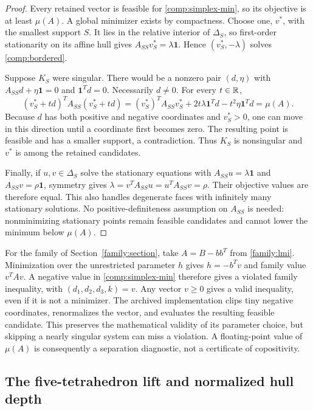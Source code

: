 \begin{proof}
Every retained vector is feasible for \eqref{comp:simplex-min}, so its
objective is at least $\mu(A)$. A global minimizer exists by compactness.
Choose one, $v^*$, with the smallest support $S$. It lies in the relative
interior of $\Delta_S$, so first-order stationarity on its affine hull gives
$A_{SS}v^*_S=\lambda\mathbf1$. Hence $(v^*_S,-\lambda)$ solves
\eqref{comp:bordered}.

Suppose $K_S$ were singular. There would be a nonzero pair $(d,\eta)$ with
$A_{SS}d+\eta\mathbf1=0$ and $\mathbf1^Td=0$. Necessarily $d\ne0$.
For every $t\in\mathbb R$,
\[
 (v^*_S+td)^TA_{SS}(v^*_S+td)
 = (v^*_S)^TA_{SS}v^*_S
   +2t\lambda\mathbf1^Td-t^2\eta\mathbf1^Td
 =\mu(A).
\]
Because $d$ has both positive and negative coordinates and $v^*_S>0$,
one can move in this direction until a coordinate first becomes zero.
The resulting point is feasible and has a smaller support, a contradiction.
Thus $K_S$ is nonsingular and $v^*$ is among the retained candidates.

Finally, if $u,v\in\Delta_S$ solve the stationary equations with
$A_{SS}u=\lambda\mathbf1$ and $A_{SS}v=\rho\mathbf1$, symmetry gives
$\lambda=v^TA_{SS}u=u^TA_{SS}v=\rho$. Their objective values are
therefore equal. This also handles degenerate faces with infinitely many
stationary solutions. No positive-definiteness assumption on $A_{SS}$
is needed: nonminimizing stationary points remain feasible candidates and
cannot lower the minimum below $\mu(A)$.
\end{proof}

For the family of Section~\ref{family:section}, take
$A=B-bb^T$ from \eqref{family:lmi}. Minimization over the unrestricted
parameter $h$ gives $h=-b^Tv$ and family value $v^TAv$.
A negative value in \eqref{comp:simplex-min} therefore gives a violated
family inequality, with $(d_1,d_2,d_3,k)=v$. Any vector $v\geq0$
gives a valid inequality, even if it is not a minimizer. The archived
implementation clips tiny negative coordinates, renormalizes the vector,
and evaluates the resulting feasible candidate. This preserves the
mathematical validity of its parameter choice, but skipping a nearly
singular system can miss a violation. A floating-point value of $\mu(A)$
is consequently a separation diagnostic, not a certificate of copositivity.

\subsection{The five-tetrahedron lift and normalized hull depth}

